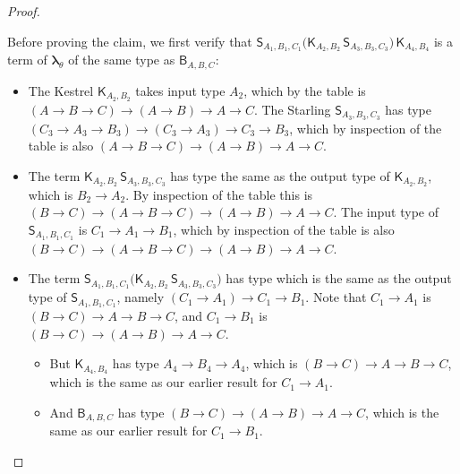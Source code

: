 \documentclass{lmcs} %
\newcommand{\param}{\theta}
\newcommand{\mltup}{\boldsymbol\lambda_{\param}}
\newcommand{\ctK}[4]{{\mathsf K}_{#1, #2}#3#4}
\newcommand{\ctS}[6]{{\mathsf S}_{#1, #2, #3}#4#5#6}
\newcommand{\ctB}[6]{{\mathsf B}_{#1, #2, #3}#4#5#6}
\begin{document}
\begin{proof}
\begin{proofdetail}
Before proving the claim, we first verify that $\ctS{A_1}{B_1}{C_1}{}{}{} \big(\ctK{A_2}{B_2}{}{} \, \ctS{A_3}{B_3}{C_3}{}{}{}  \big) \, \ctK{A_4}{B_4}{}{}$ is a term of $\mltup$ of the same type as $\ctB{A}{B}{C}{}{}{}$:
\begin{itemize}
    \item The Kestrel $\ctK{A_2}{B_2}{}{}$ takes input type $A_2$, which by the table is $(A\rightarrow B\rightarrow C)\rightarrow (A\rightarrow B)\rightarrow A\rightarrow C$. The Starling $\ctS{A_3}{B_3}{C_3}{}{}{}$ has type $(C_3\rightarrow A_3\rightarrow B_3)\rightarrow (C_3\rightarrow A_3)\rightarrow C_3\rightarrow B_3$, which by inspection of the table is also $(A\rightarrow B\rightarrow C)\rightarrow (A\rightarrow B)\rightarrow A\rightarrow C$.
    \item The term $\ctK{A_2}{B_2}{}{} \, \ctS{A_3}{B_3}{C_3}{}{}{}$ has type the same as the output type of $\ctK{A_2}{B_2}{}{}$, which is $B_2\rightarrow A_2$. By inspection of the table this is $(B\rightarrow C)\rightarrow (A\rightarrow B\rightarrow C)\rightarrow (A\rightarrow B)\rightarrow A\rightarrow C$. The input type of $\ctS{A_1}{B_1}{C_1}{}{}{}$ is $C_1\rightarrow A_1\rightarrow B_1$, which by inspection of the table is also $(B\rightarrow C)\rightarrow (A\rightarrow B\rightarrow C)\rightarrow (A\rightarrow B)\rightarrow A\rightarrow C$.
    \item The term $\ctS{A_1}{B_1}{C_1}{}{}{} \big(\ctK{A_2}{B_2}{}{} \, \ctS{A_3}{B_3}{C_3}{}{}{}  \big) $ has type which is the same as the output type of $\ctS{A_1}{B_1}{C_1}{}{}{}$, namely $(C_1\rightarrow A_1)\rightarrow C_1\rightarrow B_1$. Note that $C_1\rightarrow A_1$ is $(B\rightarrow C)\rightarrow A\rightarrow B\rightarrow C$, and $C_1\rightarrow B_1$ is $(B\rightarrow C)\rightarrow (A\rightarrow B)\rightarrow A\rightarrow C$.
\begin{itemize}
    \item But $\ctK{A_4}{B_4}{}{} $ has type $A_4\rightarrow B_4\rightarrow A_4$, which is $(B\rightarrow C)\rightarrow A\rightarrow B\rightarrow C$, which is the same as our earlier result for $C_1\rightarrow A_1$.
    \item And $\ctB{A}{B}{C}{}{}{}$ has type $(B\rightarrow C)\rightarrow (A\rightarrow B)\rightarrow A\rightarrow C$, which is the same as our earlier result for $C_1\rightarrow B_1$.
\end{itemize}
\end{itemize}


\end{proofdetail}
\end{proof}
\end{document}
